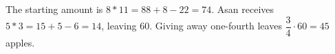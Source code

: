 The starting amount is $8*11=88+8-22=74$. Asan receives $5*3=15+5-6=14$, leaving $60$. Giving away one-fourth leaves $\dfrac{3}{4}\cdot60=\boxed{45}$ apples.

